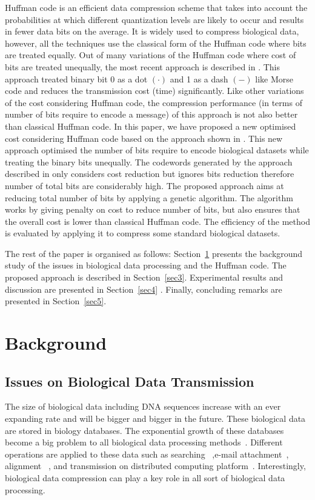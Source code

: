 \documentclass[preprint,12pt]{elsarticle}
\begin{document}
Huffman code\citep{Huff51} is an efficient data compression scheme that takes into account the probabilities at which different quantization levels are likely to occur and results in fewer data bits on the average. It is widely used to compress biological data, however, all the techniques use the classical form of the Huffman code where bits are treated equally. Out of many variations of the Huffman code where cost of bits are treated unequally, the most recent approach is described in \cite{Kab14}. This approach treated binary bit 0 as a dot $\left(\cdot\right)$ and 1 as a dash $\left(-\right)$ like Morse code and reduces the transmission cost (time) significantly. Like other variations of the cost considering Huffman code, the compression performance (in terms of number of bits require to encode a message) of this approach is not also better than classical Huffman code. In this paper, we have proposed a new optimised cost considering Huffman code based on the approach shown in \cite{Kab14}. This new approach optimised the number of bits require to encode biological datasets while treating the binary bits unequally. The codewords generated by the approach described in\cite{Kab14} only considers cost reduction but ignores bits reduction therefore number of total bits are considerably high. The proposed approach aims at reducing total number of bits   by applying a genetic algorithm. The algorithm works by giving penalty on cost to reduce number of bits, but also ensures that the overall cost is lower than classical Huffman code.  The efficiency of the method is evaluated by applying it to compress some standard biological datasets.         

The rest of the paper is organised as follows: Section~\ref{sec2} presents the background study of the issues in biological data processing and the Huffman code. The proposed approach is described in Section~\ref{sec3}. Experimental results and discussion are presented in Section~\ref{sec4} . Finally, concluding remarks are presented in Section~\ref{sec5}.



\section{Background}
\label{sec2}
\subsection{Issues on Biological Data Transmission}
The size of biological data including DNA sequences increase with an ever expanding rate and will be bigger and bigger in the future. These biological data are stored in biology databases. The exponential growth of these databases become a big problem to all biological data processing methods~\cite{Doug08}.
Different operations are applied to these data such as searching ~\cite{val10},e-mail attachment~\cite{chr09}, alignment ~\cite{che03}, and transmission on distributed computing platform~\cite{cha14}. Interestingly, biological data compression can play a key role in all sort of biological data processing. 
\end{document}

